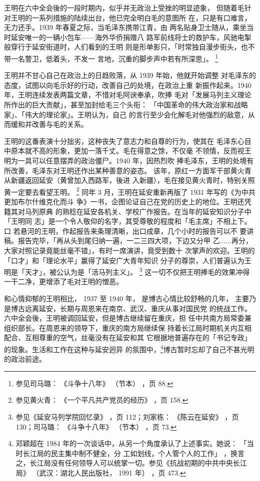王明在六中全会後的一段时期内，似乎并无政治上受挫的明显迹象，
但随着毛针对王明的一系列措施的陆续出台，他已完全明白毛的意图所
在，只是有口难言，无力还手。1939 年春夏之际，当毛泽东携带江青，由
两名贴身卫士随从，乘坐当时延安唯一的一辆小包车——海外华侨捐赠八
路军前线将士的救护车，风驰电掣般穿行于延安街道时，人们看到的王明
则是形单影只，「时常独自漫步街头，也不带一名警卫，低着头，不发一
言地，沉重的脚步声中若有所深思」。
\footnote{参见司马璐：
《斗争十八年》
（节本）
，页 88.}

王明并不甘心自己在政治上的日趋败落，从 1939 年始，他就开始调整
对毛泽东的态度，试图以向毛示好的行动，改善自己的处境，在政治上重
新振作起来。1940 年，王明连续发表两篇文章，不惜对毛阿谀奉承，吹捧
毛对「发展马列主义理论所作出的巨大贡献」，甚至加封给毛三个头衔：
「中国革命的伟大政治家和战略家」、「伟大的理论家」。王明认为，自己
的言行至少会化解毛对他强烈的敌意，从而缓和并改善与毛的关系。

王明的这番表演十分拙劣，这种丧失了意志力和自尊的行为，使其在
毛泽东心目中原本就不高的形象，更加一落千丈。毛在得意之馀，不仅毫
不领情，反而视王明为一具可以任意摆弄的政治僵尸。1940 年，因热烈吹
捧毛泽东，王明的处境有所改善，毛泽东对王明还作出某种善意的姿态。
该年，原红一方面军干部黄火青从新疆返回延安（黄曾加入西路军，後进
入新疆），毛在接见黄火青时，特别关照黄一定要去看望王明。
\footnote{参见黄火青：
《一个平凡共产党员的经历》
，页 158.}
同年
3 月，王明在延安重新再版了 1931 年写的《为中共更加布尔什维克化而斗
争》一书，企图论证自己在党的历史上的地位。王明还凭籍其对马列原典
的熟稔在延安各机关、学校广作报告。在当年的延安知识分子中「王明同
志」是一个令人敬仰的名字，其受尊敬的程度和「毛主席」不相上下。口
若悬河的王明，作起报告来条理清晰，出口成章，几个小时的报告可以不
要讲稿。报告完毕，「再从头到尾归纳一遍，一二三四大项，下边又分甲
乙......再分，大家对照记录竟能丝毫不错」，有时一席演讲，竟受到数十
次掌声的欢迎。王明的「口才」和「理论水平」赢得了延安广大青年知识
分子的尊崇，人们普遍认为王明是「天才」，被公认为是「活马列主义」。
\footnote{参见《延安马列学院回忆录》
，页 112；刘家栋：
《陈云在延安》
，页 130；司马璐：
《斗争十八年》
（节本）
，页 73.}
这一切不仅把王明捧毛的效果冲得一干二净，更增添了毛对王明的憎恶。

和心情抑郁的王明相比，
1937 至 1940 年，
是博古心情比较舒畅的几年，
主要乃是博古远离延安，长期与周恩来在南京、武汉、重庆从事对国民党
的统战工作。六中全会後，王明被调回延安，但是博古继续留在重庆，担
任中共南方局常委兼组织部长。在周恩来的领导下，重庆的南方局继续保
持着长江局时期机关内互相配合、互相尊重的空气，丝毫没有在延安和其
它根据地普遍存在的「书记专政」的现象。生活和工作在这种与延安迥异
的氛围中，\footnote{邓颖超在  1984 年的一次谈话中，从另一个角度承认了上述事实。她说：
「当时长江局的民主集中制不健全，分
工如划线，个人管个人的工作」
，换言之，长江局没有任何领导人可以统掌一切。参见《抗战初期的中共中央长江局》
（武汉：湖北人民出版社， 1991 年）
，页 473.}博古暂时忘却了自己不甚光明的政治前途。


